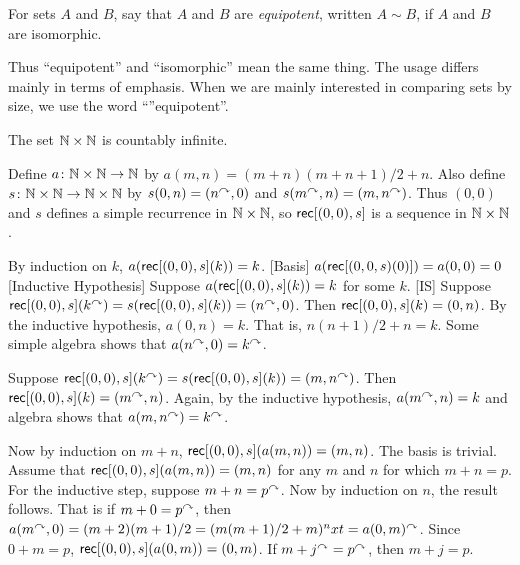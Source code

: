 \begin{defn}
	For sets $A$ and $B$, say that $A$ and $B$ are \emph{equipotent}, written $A\sim B$, if $A$ and $B$ are isomorphic.
\end{defn}

Thus ``equipotent'' and ``isomorphic'' mean the same thing.
The usage differs mainly in terms of emphasis.
When we are mainly interested in comparing sets by size, we use the word ``''equipotent''. 

\begin{example}
	The set $\mathbb N\times \mathbb N$ is countably infinite.
	
	Define ${a}\colon{\mathbb N\times \mathbb N}\to{\mathbb N}$ by $a(m,n) = (m+n)(m+n+1)/2 + n$. 
	Also define ${s}\colon{\mathbb N\times \mathbb N}\to{\mathbb N\times \mathbb N}$ by
	$s(0,n) = (n^\curvearrowright,0)$ and $s(m^\curvearrowright,n) = (m,n^\curvearrowright)$.
	Thus $(0,0)$ and $s$ defines a simple recurrence in $\mathbb N\times \mathbb N$,
	so $\mathord{\textsf{rec}}[(0,0),s]$ is a sequence in $\mathbb N\times \mathbb N$. 
	
	By induction on $k$, $a(\mathord{\textsf{rec}}[(0,0),s](k)) = k$. 
	[Basis]  $a(\mathord{\textsf{rec}}[(0,0,s)(0)])=a(0,0) = 0$
	[Inductive Hypothesis] Suppose $a(\mathord{\textsf{rec}}[(0,0),s](k)) = k$ for some $k$. 
	[IS] Suppose $\mathord{\textsf{rec}}[(0,0),s](k^\curvearrowright) = s(\mathord{\textsf{rec}}[(0,0),s](k)) = (n^\curvearrowright,0)$. Then $\mathord{\textsf{rec}}[(0,0),s](k) = (0,n)$. By the inductive hypothesis, $a(0,n)=k$. That is,
	$n(n+1)/2+n = k$. Some simple algebra shows that $a(n^\curvearrowright,0)= k^\curvearrowright$.
	
	Suppose $\mathord{\textsf{rec}}[(0,0),s](k^\curvearrowright) = s(\mathord{\textsf{rec}}[(0,0),s](k)) = (m,n^\curvearrowright)$.
	Then $\mathord{\textsf{rec}}[(0,0),s](k) = (m^\curvearrowright,n)$.
	Again, by the inductive hypothesis, $a(m^\curvearrowright,n)=k$ and algebra shows 
	that $a(m,n^\curvearrowright) = k^\curvearrowright$.
	
	Now by induction on $m+n$, $\mathord{\textsf{rec}}[(0,0),s](a(m,n)) = (m,n)$.
	The basis is trivial. 
	Assume that $\mathord{\textsf{rec}}[(0,0),s](a(m,n)) = (m,n)$ for any $m$ and $n$ for which $m+n=p$. 
	For the inductive step, suppose $m+n=p^\curvearrowright$. 
	Now by induction on $n$, the result follows. 
	That is if $m+0 = p^\curvearrowright$,
	then $a(m^\curvearrowright,0)= (m+2)(m+1)/2 = (m(m+1)/2 + m)^nxt = a(0,m)^\curvearrowright$. Since $0+m=p$,
	$\mathord{\textsf{rec}}[(0,0),s](a(0,m)) = (0,m)$. If $m+j^\curvearrowright = p^\curvearrowright$, then $m+j = p$. 
	
\end{example}


